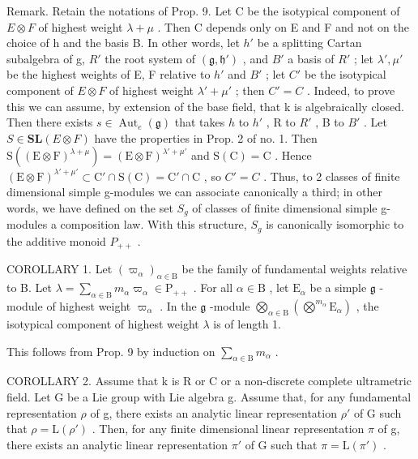 Remark. Retain the notations of Prop. 9. Let C be the isotypical component of \(E \otimes F\) of highest weight \(\lambda + \mu\) . Then C depends only on E and F and not on the choice of h and the basis B. In other words, let \(h'\) be a splitting Cartan subalgebra of g, \(R'\) the root system of \((\mathfrak{g}, \mathfrak{h}')\) , and \(B'\) a basis of \(R'\) ; let \(\lambda', \mu'\) be the highest weights of E, F relative to \(h'\) and \(B'\) ; let \(C'\) be the isotypical component of \(E \otimes F\) of highest weight \(\lambda' + \mu'\) ; then \(C' = C\) . Indeed, to prove this we can assume, by extension of the base field, that k is algebraically closed. Then there exists \(s \in \operatorname{Aut}_{e}(\mathfrak{g})\) that takes \(h\) to \(h'\) , R to \(R'\) , B to \(B'\) . Let \(S \in \mathbf{SL}(E \otimes F)\) have the properties in Prop. 2 of no. 1. Then \(\mathrm{S}((\mathrm{E} \otimes \mathrm{F})^{\lambda + \mu}) = (\mathrm{E} \otimes \mathrm{F})^{\lambda' + \mu'}\) and \(\mathrm{S}(\mathrm{C}) = \mathrm{C}\) . Hence \((\mathrm{E} \otimes \mathrm{F})^{\lambda' + \mu'} \subset \mathrm{C}' \cap \mathrm{S}(\mathrm{C}) = \mathrm{C}' \cap \mathrm{C}\) , so \(C' = C\) . Thus, to 2 classes of finite dimensional simple g-modules we can associate canonically a third; in other words, we have defined on the set \(S_{g}\) of classes of finite dimensional simple g-modules a composition law. With this structure, \(S_{g}\) is canonically isomorphic to the additive monoid \(P_{++}\) .

COROLLARY 1. Let \((\varpi_{\alpha})_{\alpha \in \mathrm{B}}\) be the family of fundamental weights relative to B. Let \(\lambda = \sum_{\alpha \in \mathrm{B}} m_{\alpha} \varpi_{\alpha} \in \mathrm{P}_{++}\) . For all \(\alpha \in \mathrm{B}\) , let \(\mathrm{E}_{\alpha}\) be a simple \(\mathfrak{g}\) -module of highest weight \(\varpi_{\alpha}\) . In the \(\mathfrak{g}\) -module \(\bigotimes_{\alpha \in \mathrm{B}} (\bigotimes^{m_{\alpha}} \mathrm{E}_{\alpha})\) , the isotypical component of highest weight \(\lambda\) is of length 1.

This follows from Prop. 9 by induction on \(\sum_{\alpha \in \mathrm{B}}m_{\alpha}\) .

COROLLARY 2. Assume that k is R or C or a non-discrete complete ultrametric field. Let G be a Lie group with Lie algebra g. Assume that, for any fundamental representation \(\rho\) of g, there exists an analytic linear representation \(\rho'\) of G such that \(\rho = \mathrm{L}(\rho')\) . Then, for any finite dimensional linear representation \(\pi\) of g, there exists an analytic linear representation \(\pi'\) of G such that \(\pi = \mathrm{L}(\pi')\) .

